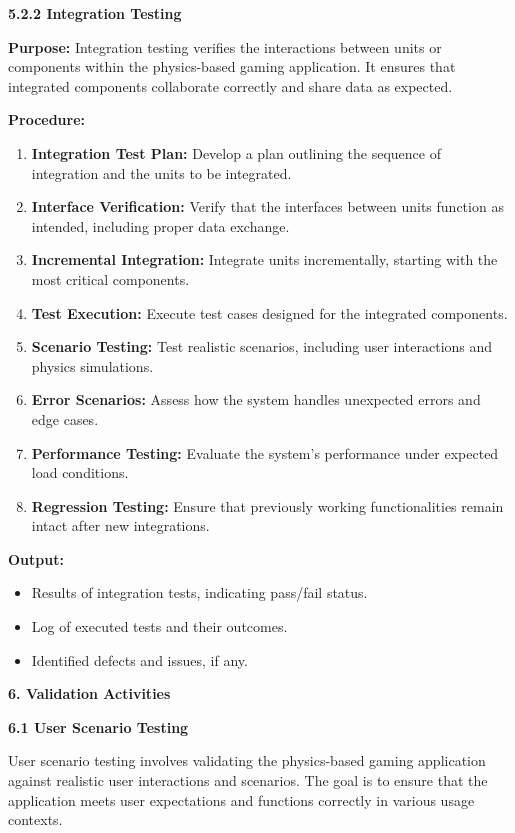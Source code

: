 \documentclass[
]{article}
\begin{document}
\textbf{5.2.2 Integration Testing}

\textbf{Purpose:} Integration testing verifies the interactions between
units or components within the physics-based gaming application. It
ensures that integrated components collaborate correctly and share data
as expected.

\textbf{Procedure:}

\begin{enumerate}
\def\labelenumi{\arabic{enumi}.}
\item
  \textbf{Integration Test Plan:} Develop a plan outlining the sequence
  of integration and the units to be integrated.
\item
  \textbf{Interface Verification:} Verify that the interfaces between
  units function as intended, including proper data exchange.
\item
  \textbf{Incremental Integration:} Integrate units incrementally,
  starting with the most critical components.
\item
  \textbf{Test Execution:} Execute test cases designed for the
  integrated components.
\item
  \textbf{Scenario Testing:} Test realistic scenarios, including user
  interactions and physics simulations.
\item
  \textbf{Error Scenarios:} Assess how the system handles unexpected
  errors and edge cases.
\item
  \textbf{Performance Testing:} Evaluate the system's performance under
  expected load conditions.
\item
  \textbf{Regression Testing:} Ensure that previously working
  functionalities remain intact after new integrations.
\end{enumerate}

\textbf{Output:}

\begin{itemize}
\item
  Results of integration tests, indicating pass/fail status.
\item
  Log of executed tests and their outcomes.
\item
  Identified defects and issues, if any.
\end{itemize}

\protect\hypertarget{Af}{}{}\textbf{6. Validation Activities}


\protect\hypertarget{Af1}{}{}\textbf{6.1 User Scenario Testing}

User scenario testing involves validating the physics-based gaming
application against realistic user interactions and scenarios. The goal
is to ensure that the application meets user expectations and functions
correctly in various usage contexts.
\end{document}
